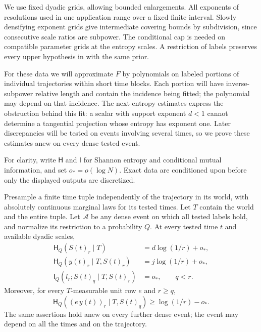 We use fixed dyadic grids, allowing bounded enlargements.
All exponents of resolutions used in one application range over a fixed
finite interval.  Slowly densifying exponent grids give intermediate
covering bounds by subdivision, since consecutive scale ratios are
subpower.  The conditional cap  is needed on compatible
parameter grids at the entropy scales.  A restriction of labels preserves
every upper hypothesis in  with the same prior.

For these data we will approximate \(F\) by polynomials on labeled
portions of individual trajectories within short time blocks.  Each
portion will have inverse-subpower relative length and contain the
incidence being fitted; the polynomial may depend on that incidence.
The next entropy estimates express the obstruction behind this fit:
a scalar with support exponent \(d<1\) cannot determine a tangential
projection whose entropy has exponent one.  Later discrepancies will
be tested on events involving several times, so we prove these estimates
anew on every dense tested event.

For clarity, write \(\mathsf H\) and \(\mathsf I\) for Shannon entropy
and conditional mutual information, and set \(o_*=o(\log N)\).
Exact data are conditioned upon before only the displayed outputs are
discretized.

\begin{lemma}\label{a04:dense-entropy}
Presample a finite time tuple independently of the trajectory in its
world, with absolutely continuous marginal laws for its tested times.
Let \(T\) contain the world and the entire tuple.
Let \(\mathcal A\) be any dense event on which all tested labels hold,
and normalize its restriction to a probability \(Q\).
At every tested time \(t\) and available dyadic scales,
\begin{align}
 \mathsf H_Q(S(t)_r\mid T)
   &=d\log(1/r)+o_*,\label{a04:scalar-entropy}\\
 \mathsf H_Q(y(t)_r\mid T,S(t)_r)
   &=j\log(1/r)+o_*,\label{a04:tangential-entropy}\\
 \mathsf I_Q(l_r;S(t)_q\mid T,S(t)_r)
   &=o_*,\qquad q<r.\label{a04:entropy-independence}
\end{align}
Moreover, for every \(T\)-measurable unit row \(e\) and \(r\ge q\),
\begin{equation}\label{a04:projection-entropy}
 \mathsf H_Q((e\,y(t))_r\mid T,S(t)_q)
       \ge\log(1/r)-o_*.
\end{equation}
The same assertions hold anew on every further dense event; the event
may depend on all the times and on the trajectory.
\end{lemma}

